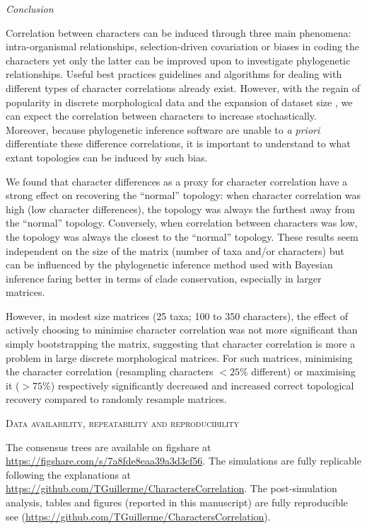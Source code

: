 \documentclass[12pt,letterpaper]{article}
\renewcommand{\section}[1]{%
\bigskip
\begin{center}
\begin{Large}
\normalfont\scshape #1
\medskip
\end{Large}
\end{center}}
\renewcommand{\subsection}[1]{%
\bigskip
\begin{center}
\begin{large}
\normalfont\itshape #1
\end{large}
\end{center}}
\begin{document}
\subsection{Conclusion}
Correlation between characters can be induced through three main phenomena: intra-organismal relationships, selection-driven covariation or biases in coding the characters yet only the latter can be improved upon to investigate phylogenetic relationships.
Useful best practices guidelines \citep[e.g.][]{Brazeau2011,simoes2017giant} and algorithms for dealing with different types of character correlations \citep[e.g. for characters hierarchy][]{deLaet2015,BrazeauNA} already exist.
However, with the regain of popularity in discrete morphological data and the expansion of dataset size \citep[e.g.][with more than 1000 characters each]{nithe2013,O'Leary08022013}, we can expect the correlation between characters to increase stochastically.
Moreover, because phylogenetic inference software are unable to \textit{a priori} differentiate these difference correlations, it is important to understand to what extant topologies can be induced by such bias.

We found that character differences as a proxy for character correlation have a strong effect on recovering the ``normal'' topology: when character correlation was high (low character differences), the topology was always the furthest away from the ``normal'' topology.
Conversely, when correlation between characters was low, the topology was always the closest to the ``normal'' topology.
These results seem independent on the size of the matrix (number of taxa and/or characters) but can be influenced by the phylogenetic inference method used with Bayesian inference faring better in terms of clade conservation, especially in larger matrices.

However, in modest size matrices (25 taxa; 100 to 350 characters), the effect of actively choosing to minimise character correlation was not more significant than simply bootstrapping the matrix, suggesting that character correlation is more a problem in large discrete morphological matrices.
For such matrices, minimising the character correlation (resampling characters $<25$\% different) or maximising it ($>75$\%) respectively significantly decreased and increased correct topological recovery compared to randomly resample matrices.


\section{Data availability, repeatability and reproducibility}
The consensus trees are available on figshare at \url{https://figshare.com/s/7a8fde8eaa39a3d3cf56}.
The simulations are fully replicable following the explanations at \url{https://github.com/TGuillerme/CharactersCorrelation}.
The post-simulation analysis, tables and figures (reported in this manuscript) are fully reproducible see (\url{https://github.com/TGuillerme/CharactersCorrelation}).
\end{document}
